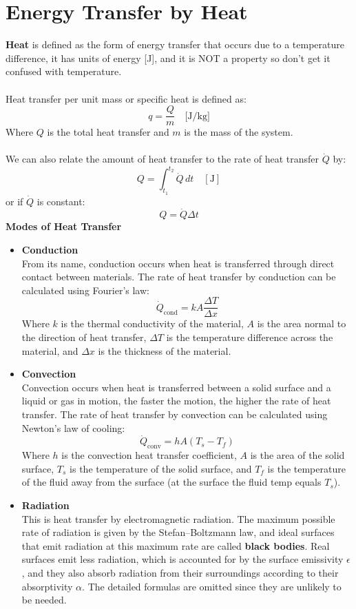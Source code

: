 \documentclass[12pt]{article}
\begin{document}
\section*{Energy Transfer by Heat}
\textbf{Heat} is defined as the form of energy transfer that occurs due to a temperature difference, it has units of energy [J], and it is NOT a property so don't get it confused with temperature.\\\\
Heat transfer per unit mass or specific heat is defined as:
\[q = \frac{Q}{m} \quad \text{[J/kg]}\]
Where $Q$ is the total heat transfer and $m$ is the mass of the system.\\\\
We can also relate the amount of heat transfer to the rate of heat transfer $\dot{Q}$ by:
\[Q = \int_{t_1}^{t_2} \dot{Q} \, dt \quad [\text{J}]\]
or if $\dot{Q}$ is constant:
\[Q = \dot{Q} \Delta t\]
\textbf{Modes of Heat Transfer}
\begin{itemize}
    \item \textbf{Conduction}\\
From its name, conduction occurs when heat is transferred through direct contact between materials. The rate of heat transfer by conduction can be calculated using Fourier's law:
\[\boxed{\dot{Q}_{\text{cond}} = k A \frac{\Delta T}{\Delta x}}\]
Where $k$ is the thermal conductivity of the material, $A$ is the area normal to the direction of heat transfer, $\Delta T$ is the temperature difference across the material, and $\Delta x$ is the thickness of the material.
    \item \textbf{Convection}\\
Convection occurs when heat is transferred between a solid surface and a liquid or gas in motion, the faster the motion, the higher the rate of heat transfer. The rate of heat transfer by convection can be calculated using Newton's law of cooling:
\[\boxed{\dot{Q}_{\text{conv}} = h A (T_s - T_f)}\]
Where $h$ is the convection heat transfer coefficient, $A$ is the area of the solid surface, $T_s$ is the temperature of the solid surface, and $T_f$ is the temperature of the fluid away from the surface (at the surface the fluid temp equals $T_s$).
    \item \textbf{Radiation}\\
This is heat transfer by electromagnetic radiation. The maximum possible rate of radiation is given by the Stefan--Boltzmann law, and ideal surfaces that emit radiation at this maximum rate are called \textbf{black bodies}. Real surfaces emit less radiation, which is accounted for by the surface emissivity $\epsilon$, and they also absorb radiation from their surroundings according to their absorptivity $\alpha$. The detailed formulas are omitted since they are unlikely to be needed.
\end{itemize}
\end{document}
